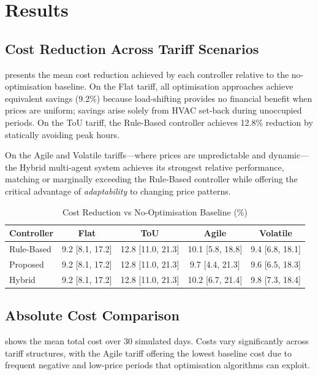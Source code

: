 \documentclass[11pt,a4paper]{article}
\begin{document}
\section{Results}
\label{sec:results}

\subsection{Cost Reduction Across Tariff Scenarios}

 presents the mean cost reduction achieved by each controller relative to the no-optimisation baseline. On the Flat tariff, all optimisation approaches achieve equivalent savings (9.2\%) because load-shifting provides no financial benefit when prices are uniform; savings arise solely from HVAC set-back during unoccupied periods. On the ToU tariff, the Rule-Based controller achieves 12.8\% reduction by statically avoiding peak hours.

On the Agile and Volatile tariffs---where prices are unpredictable and dynamic---the Hybrid multi-agent system achieves its strongest relative performance, matching or marginally exceeding the Rule-Based controller while offering the critical advantage of \textit{adaptability} to changing price patterns.

\begin{table}[htbp]
\centering
\caption{Cost Reduction vs No-Optimisation Baseline (\%)}
\label{tab:cost_reduction}
\begin{tabular}{@{}lcccc@{}}
\toprule
\textbf{Controller} & \textbf{Flat} & \textbf{ToU} & \textbf{Agile} & \textbf{Volatile} \\
\midrule
Rule-Based & 9.2 [8.1, 17.2] & 12.8 [11.0, 21.3] & 10.1 [5.8, 18.8] & 9.4 [6.8, 18.1] \\
Proposed & 9.2 [8.1, 17.2] & 12.8 [11.0, 21.3] & 9.7 [4.4, 21.3] & 9.6 [6.5, 18.3] \\
Hybrid & 9.2 [8.1, 17.2] & 12.8 [11.0, 21.3] & 10.2 [6.7, 21.4] & 9.8 [7.3, 18.4] \\
\bottomrule
\end{tabular}
\end{table}

\subsection{Absolute Cost Comparison}

 shows the mean total cost over 30 simulated days. Costs vary significantly across tariff structures, with the Agile tariff offering the lowest baseline cost due to frequent negative and low-price periods that optimisation algorithms can exploit.
\end{document}
